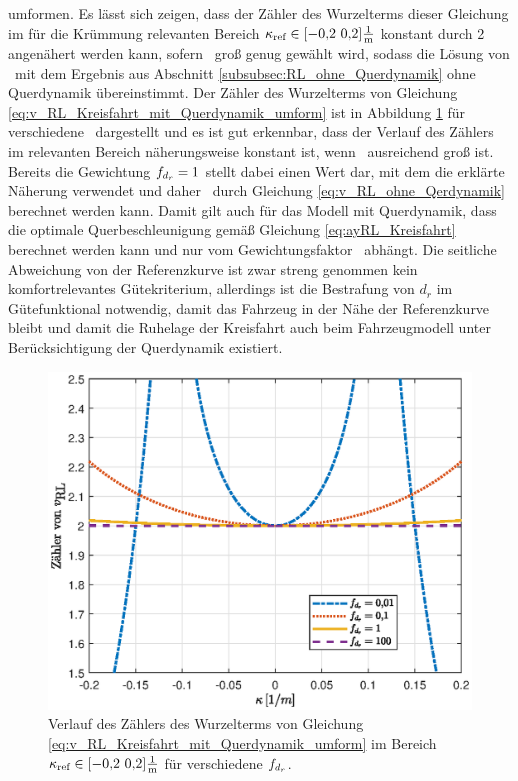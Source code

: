umformen. Es lässt sich zeigen, dass der Zähler des Wurzelterms dieser Gleichung im für die Krümmung relevanten Bereich $\kappa_{\textrm{ref}}\in [-0{,}2~0{,}2]\frac{1}{\mathrm{m}}$ konstant durch 2 angenähert werden kann, sofern \fdr~groß genug gewählt wird, sodass die Lösung von \vRL~mit dem Ergebnis aus Abschnitt \ref{subsubsec:RL_ohne_Querdynamik} ohne Querdynamik übereinstimmt. Der Zähler des Wurzelterms von Gleichung \eqref{eq:v_RL_Kreisfahrt_mit_Querdynamik_umform} ist in Abbildung \ref{fig:zaehler_vRL} für verschiedene \fdr~dargestellt und es ist gut erkennbar, dass der Verlauf des Zählers im relevanten Bereich näherungsweise konstant ist, wenn \fdr~ausreichend groß ist. Bereits die Gewichtung $f_{d_r}=1$ stellt dabei einen Wert dar, mit dem die erklärte Näherung verwendet und daher \vRL~durch Gleichung \eqref{eq:v_RL_ohne_Qerdynamik} berechnet werden kann. Damit gilt auch für das Modell mit Querdynamik, dass die optimale Querbeschleunigung gemäß Gleichung \eqref{eq:ayRL_Kreisfahrt} berechnet werden kann und nur vom Gewichtungsfaktor \fay~abhängt. Die seitliche Abweichung von der Referenzkurve ist zwar streng genommen kein komfortrelevantes Gütekriterium, allerdings ist die Bestrafung von $d_r$ im Gütefunktional notwendig, damit das Fahrzeug in der Nähe der Referenzkurve bleibt und damit die Ruhelage der Kreisfahrt auch beim Fahrzeugmodell unter Berücksichtigung der Querdynamik existiert.
\begin{figure}[h] 
	\centering
	\includegraphics[width=0.7\linewidth]{./Bilder/Ergebnisse/Kreisfahrt/Mit_Querdynamik/zaehler_vRL.eps}
	\caption{Verlauf des Zählers des Wurzelterms von Gleichung \eqref{eq:v_RL_Kreisfahrt_mit_Querdynamik_umform} im Bereich $\kappa_{\textrm{ref}}\in [-0{,}2~0{,}2]\frac{1}{\mathrm{m}}$ für verschiedene $f_{d_r}$.}
	\label{fig:zaehler_vRL}
\end{figure} 

